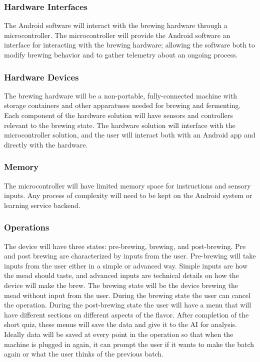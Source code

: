 \documentclass[draftclsnofoot,onecolumn,letterpaper,10pt]{IEEEtran}
\begin{document}
\subsubsection{Hardware Interfaces}
The Android software will interact with the brewing hardware through a microcontroller.
The microcontroller will provide the Android software an interface for interacting with 
the brewing hardware; allowing the software both to modify brewing behavior and to gather
telemetry about an ongoing process.

\subsubsection{Hardware Devices}
The brewing hardware will be a non-portable, fully-connected machine with storage containers 
and other apparatuses needed for brewing and fermenting. 
Each component of the hardware solution will have sensors and controllers relevant to the brewing
state.
The hardware solution will interface with the microcontroller solution, and the user will interact 
both with an Android app and directly with the hardware.

\subsubsection{Memory}
The microcontroller will have limited memory space for instructions and sensory inputs. Any
process of complexity will need to be kept on the Android system or learning service backend.

\subsubsection{Operations}
The device will have three states: pre-brewing, brewing, and post-brewing.
Pre and post brewing are characterized by inputs from the user.
Pre-brewing will take inputs from the user either in a simple or advanced way.
Simple inputs are how the mead should taste, and advanced inputs are technical details on how the device will make the brew.
The brewing state will be the device brewing the mead without input from the user.
During the brewing state the user can cancel the operation.
During the post-brewing state the user will have a menu that will have different sections on different aspects of the flavor.
After completion of the short quiz, these menus will save the data and give it to the AI for analysis.
Ideally data will be saved at every point in the operation so that when the machine is plugged in again, it can prompt the user if it wants to make the batch again or what the user thinks of the previous batch.
\end{document}
